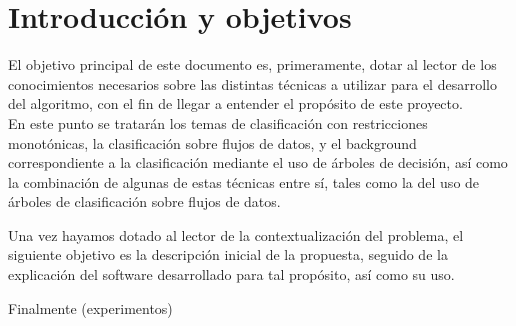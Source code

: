 \chapter[Capítulo 1. Introducción y objetivos]{Introducción y objetivos}

El objetivo principal de este documento es, primeramente, dotar al lector de los conocimientos necesarios sobre las distintas técnicas a utilizar para el desarrollo del algoritmo, con el fin de llegar a entender el propósito de este proyecto.\\
En este punto se tratarán los temas de clasificación con restricciones monotónicas, la clasificación sobre flujos de datos, y el background correspondiente a la clasificación mediante el uso de árboles de decisión, así como la combinación de algunas de estas técnicas entre sí, tales como la del uso de árboles de clasificación sobre flujos de datos.

Una vez hayamos dotado al lector de la contextualización del problema, el siguiente objetivo es la descripción inicial de la propuesta, seguido de la explicación del software desarrollado para tal propósito, así como su uso.

Finalmente (experimentos)

\newpage

